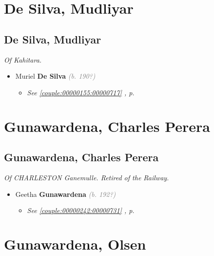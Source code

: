 \documentclass[10pt, openany]{book}
\begin{document}
\part{De Silva, Mudliyar}
\chapter{De Silva, Mudliyar}
\label{00000154}
\textcolor{slmaroon}{\textit{Of Kahitara.}}
\begin{itemize}
\item{Muriel \textbf{De Silva} \textcolor{gray}{\textit{(b. 190?)}}
\begin{itemize}
\item{\textcolor{slteal}{\textit{See  \autoref{couple:00000155:00000717} \textit{, p. \pageref{couple:00000155:00000717} }}}}
\end{itemize}
  }
\end{itemize}
  
\part{Gunawardena, Charles Perera}
\chapter{Gunawardena, Charles Perera}
\label{00000241}
\textcolor{slmaroon}{\textit{Of CHARLESTON Ganemulle. Retired of the Railway.}}
\begin{itemize}
\item{Geetha \textbf{Gunawardena} \textcolor{gray}{\textit{(b. 192?)}}
\begin{itemize}
\item{\textcolor{slteal}{\textit{See  \autoref{couple:00000242:00000731} \textit{, p. \pageref{couple:00000242:00000731} }}}}
\end{itemize}
 }
\end{itemize}
  
\part{Gunawardena, Olsen}
\end{document}
